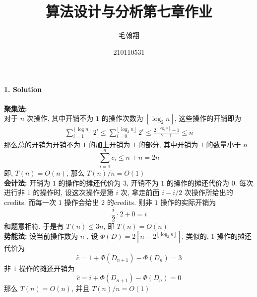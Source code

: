 \documentclass[a4paper, 10pt]{ctexart} %
\title{算法设计与分析第七章作业}
\author{毛翰翔\and 210110531}
\begin{document}
\maketitle

\paragraph{1. Solution} %
\label{par:what is this}
\textbf{聚集法: }
\\ [7pt]
对于 $n$ 次操作, 其中开销不为 $1$ 的操作次数为 $\displaystyle \left\lfloor \log _{2}n \right\rfloor$, 这些操作的开销即为
\[
\begin{aligned}
\sum_{i=1} ^{\left\lfloor \log n \right\rfloor} 2 ^{i}  \le \sum_{i=0}  ^{\left\lfloor \log _{2} n \right\rfloor} 2 ^{i}\le \frac{2 ^{\left\lfloor \log _{2} n \right\rfloor}-1}{2-1} \le n
\end{aligned}
\]
那么总的开销为开销不为 $1$ 的加上开销为 $1$ 的部分, 其中开销为 $1$ 的数量小于 $n$
\[
\sum_{i=1} ^{n} c_{i} \le n + n =2n 
\]
即, $T\left(n\right) = O\left(n\right)$, 那么 $T\left(n \right)/n = O\left(1\right)$
\\ [7pt]
\textbf{会计法: }
开销为 $1$ 的操作的摊还代价为 $3$, 开销不为 $1$ 的操作的摊还代价为 $0$. 每次进行非 $1$ 的操作时, 设这次操作是第 $i$ 次, 拿走前面 $i -  i / 2$ 次操作所给出的credits. 而每一次 $1$ 操作会给出 $2$ 的credits. 则非 $1$ 操作的实际开销为 
$$ \frac{i}{2} \cdot 2 + 0 = i$$
和题意相符, 于是有 $T\left(n\right) \le 3n$, 即 $T\left(n\right) = O\left(n\right)$
\\ [7pt]
\textbf{势能法: }
设当前操作数为 $n$ , 设 $\varPhi\left(D\right) =2\left[ n - 2^{\left\lfloor \log _{2  } n \right\rfloor}\right]$, 类似的, $1$ 操作的摊还代价为
\[
\hat{c} = 1 + \varPhi \left(D_{n+1}\right) - \varPhi \left(D_{n}\right) = 3
\] 
非 $1$ 操作的摊还开销为 
\[
\hat{c} =  i + \varPhi \left(D_{n+1}\right)  - \varPhi \left(D_{n}\right)= 0
\]
那么 $T \left(n\right) = O\left(n\right)$, 并且 $T \left(n \right) /n  = O\left(1\right)$


\end{document}
